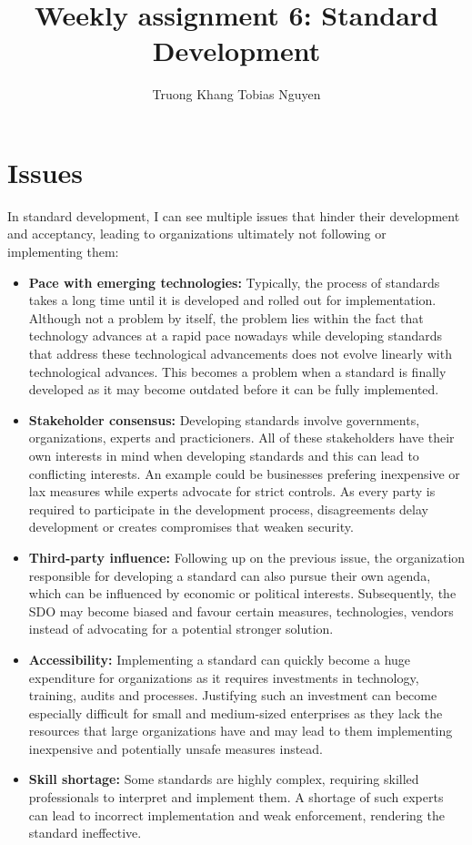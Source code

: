 \documentclass[12pt]{article}
\title{Weekly assignment 6: Standard Development}
\author{Truong Khang Tobias Nguyen}
\date{}
\begin{document}
\maketitle

\section{Issues}
In standard development, I can see multiple issues that hinder their development and acceptancy, leading to organizations ultimately not following or implementing them:
\begin{itemize}
\item \textbf{Pace with emerging technologies:} Typically, the process of standards takes a long time until it is developed and rolled out for implementation. Although not a problem by itself, the problem lies within the fact that technology advances at a rapid pace nowadays while developing standards that address these technological advancements does not evolve linearly with technological advances. This becomes a problem when a standard is finally developed as it may become outdated before it can be fully implemented.
\item \textbf{Stakeholder consensus:} Developing standards involve governments, organizations, experts and practicioners. All of these stakeholders have their own interests in mind when developing standards and this can lead to conflicting interests. An example could be businesses prefering inexpensive or lax measures while experts advocate for strict controls. As every party is required to participate in the development process, disagreements delay development or creates compromises that weaken security.
\item \textbf{Third-party influence:} Following up on the previous issue, the organization responsible for developing a standard can also pursue their own agenda, which can be influenced by economic or political interests. Subsequently, the SDO may become biased and favour certain measures, technologies, vendors instead of advocating for a potential stronger solution. 
\item \textbf{Accessibility:} Implementing a standard can quickly become a huge expenditure for organizations as it requires investments in technology, training, audits and processes. Justifying such an investment can become especially difficult for small and medium-sized enterprises as they lack the resources that large organizations have and may lead to them implementing inexpensive and potentially unsafe measures instead.
\item \textbf{Skill shortage:} Some standards are highly complex, requiring skilled professionals to interpret and implement them. A shortage of such experts can lead to incorrect implementation and weak enforcement, rendering the standard ineffective.
\end{itemize}
\end{document}
